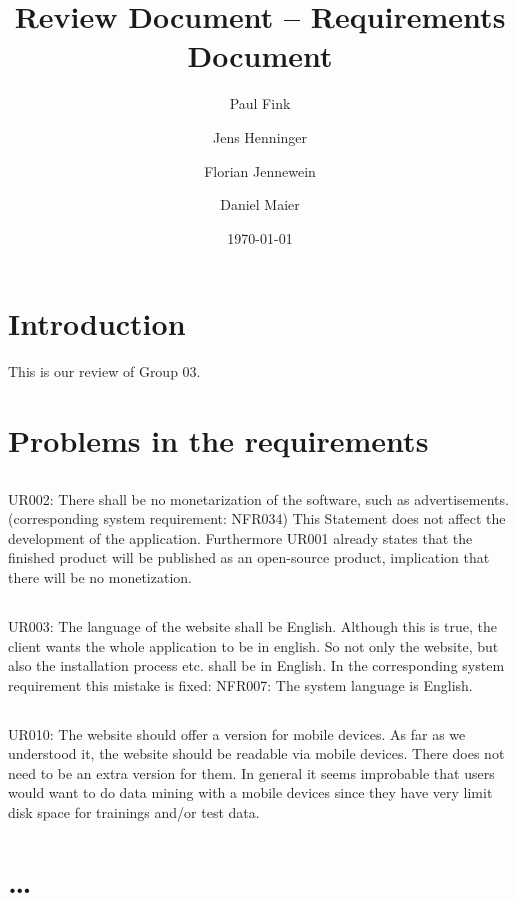 \documentclass{article}
\title{Review Document -- Requirements Document}
\author{Paul Fink \and Jens Henninger \and Florian Jennewein \and Daniel Maier}
\date{\today}
\begin{document}
\maketitle

\section{Introduction}
This is our review of Group 03. 
 
\section{Problems in the requirements}
\subsection{}
UR002: There shall be no monetarization of the software, such as advertisements. (corresponding system requirement: NFR034)
This Statement does not affect the development of the application. Furthermore UR001 already states that the finished product will be published as an open-source product, implication that there will be no monetization.
\subsection{}
UR003: The language of the website shall be English. 
Although this is true, the client wants the whole application to be in english. So not only the website, but also the installation process etc. shall be in English. In the corresponding system requirement this mistake is fixed: 
NFR007: The system language is English.
\subsection{}
UR010: The website should offer a version for mobile devices. 
As far as we understood it, the website should be readable via mobile devices. There does not need to be an extra version for them. In general it seems improbable that users would want to do data mining with a mobile devices since they have very limit disk space for trainings and/or test data.
\paragraph{}

 
\section{\ldots}
 
\end{document}
